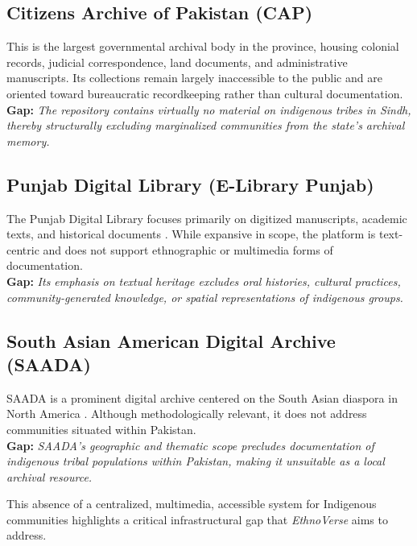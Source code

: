 \subsection*{Citizens Archive of Pakistan (CAP)}
This is the largest governmental archival body in the province, housing colonial records, judicial correspondence, land documents, and administrative manuscripts. Its collections remain largely inaccessible to the public and are oriented toward bureaucratic recordkeeping rather than cultural documentation.  
\\ \textbf{Gap:} \textit{The repository contains virtually no material on indigenous tribes in Sindh, thereby structurally excluding marginalized communities from the state’s archival memory.}

\subsection*{Punjab Digital Library (E-Library Punjab)}
The Punjab Digital Library focuses primarily on digitized manuscripts, academic texts, and historical documents \cite{punjablibrary}. While expansive in scope, the platform is text-centric and does not support ethnographic or multimedia forms of documentation.  
\\ \textbf{Gap:} \textit{Its emphasis on textual heritage excludes oral histories, cultural practices, community-generated knowledge, or spatial representations of indigenous groups.}

\subsection*{South Asian American Digital Archive (SAADA)}
SAADA is a prominent digital archive centered on the South Asian diaspora in North America \cite{saada}. Although methodologically relevant, it does not address communities situated within Pakistan.  
\\ \textbf{Gap:} \textit{SAADA’s geographic and thematic scope precludes documentation of indigenous tribal populations within Pakistan, making it unsuitable as a local archival resource.}

This absence of a centralized, multimedia, accessible system for Indigenous 
communities highlights a critical infrastructural gap that \textit{EthnoVerse} aims 
to address.

